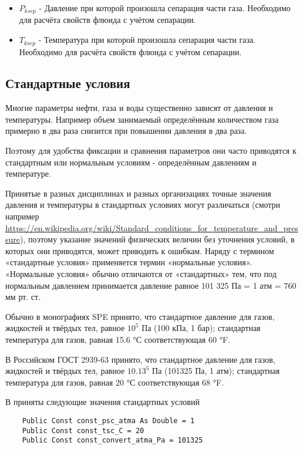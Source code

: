 \begin{itemize}
\item $P_{ksep}$ - Давление при которой произошла сепарация части газа. Необходимо для расчёта свойств флюида с учётом сепарации. 

\item $T_{ksep}$ - Температура при которой произошла сепарация части газа. Необходимо для расчёта свойств флюида с учётом сепарации. 

\end{itemize}

\subsection{Стандартные условия} 
Многие параметры нефти, газа и воды существенно зависят от давления и температуры. Например объем занимаемый определённым количеством газа примерно в два раза снизится при повышении давления в два раза. 

Поэтому для удобства фиксации и сравнения параметров они часто приводятся к стандартным или нормальным условиям - определённым давлениям и температуре. 
	
	Принятые в разных дисциплинах и разных организациях точные значения давления и температуры в стандартных условиях могут различаться (смотри например \url{https://en.wikipedia.org/wiki/Standard_conditions_for_temperature_and_pressure}), поэтому указание значений физических величин без уточнения условий, в которых они приводятся, может приводить к ошибкам. Наряду с термином «стандартные условия» применяется термин «нормальные условия». «Нормальные условия» обычно отличаются от «стандартных» тем, что под нормальным давлением принимается давление равное 101 325 Па = 1 атм = 760 мм рт. ст.
	
	Обычно в монографиях SPE принято, что стандартное давление для газов, жидкостей и твёрдых тел, равное $10^5$ Па (100 кПа, 1 бар); стандартная температура для газов, равная 15.6 °С соответствующая 60 °F. 
	
	В Российском ГОСТ 2939-63  принято, что стандартное давление для газов, жидкостей и твёрдых тел, равное $10.13^5$ Па (101325 Па, 1 атм); стандартная температура для газов, равная 20 °С соответствующая 68 °F. 
	
	В \unf{} приняты следующие значения стандартных условий
	
	
	\begin{listing}[H]
	\begin{verbatim}
	Public Const const_psc_atma As Double = 1
	Public Const const_tsc_C = 20
	Public Const const_convert_atma_Pa = 101325
	\end{verbatim}
\end{listing}

